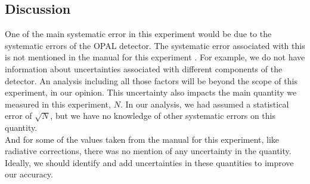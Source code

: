 \subsection{Discussion}
One of the main systematic error in this experiment would be due to the systematic errors of the OPAL detector. The systematic error associated with this is not mentioned in the manual for this experiment \cite{UB}. For example, we do not have information about uncertainties associated with different components of the detector. An analysis including all those factors will be beyond the scope of this experiment, in our opinion. This uncertainty also impacts the main quantity we measured in this experiment, $N$. In our analysis, we had assumed a statistical error of $\sqrt{N}$, but we have no knowledge of other systematic errors on this quantity.\\
And for some of the values taken from the manual for this experiment, like radiative corrections, there was no mention of any uncertainty in the quantity. Ideally, we should identify and add uncertainties in these quantities to improve our accuracy.
